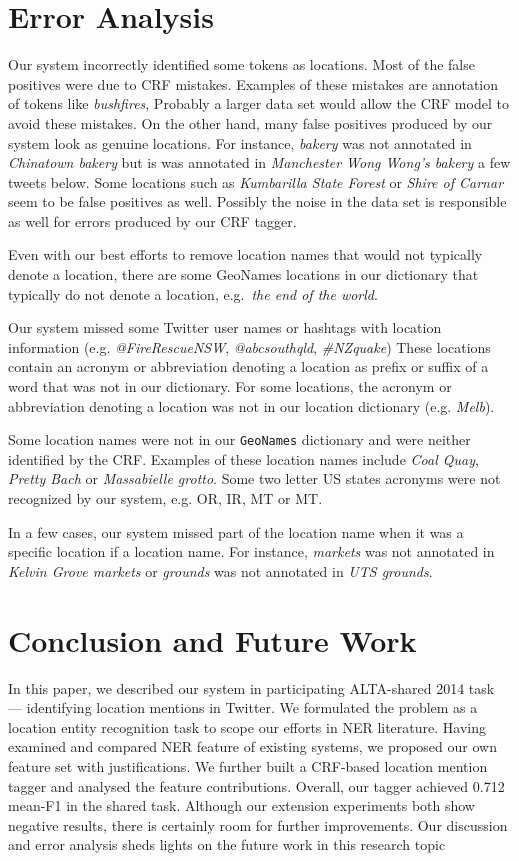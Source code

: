 \documentclass[11pt]{article}
\newcommand{\geoname}{\texttt{GeoNames}\xspace}
\newcommand{\myex}[1]{\textit{#1}}
\begin{document}
\section{Error Analysis}
\label{sec:error_analysis}

Our system incorrectly identified some tokens as locations.
Most of the false positives were due to CRF mistakes.
Examples of these mistakes are annotation of tokens like \myex{bushfires}, 
Probably a larger data set would allow the CRF model to avoid these mistakes.
On the other hand, many false positives produced by our system look as genuine locations.
For instance, \myex{bakery} was not annotated in \myex{Chinatown bakery} but is was annotated in \myex{Manchester Wong Wong's bakery} a few tweets below.
Some locations such as \myex{Kumbarilla State Forest} or \myex{Shire of Carnar} seem to be false positives as well.
Possibly the noise in the data set is responsible as well for errors produced by our CRF tagger.

Even with our best efforts to remove location names that would not typically denote a location, there are some GeoNames locations in our dictionary that typically do not denote a location, e.g.~\myex{the end of the world}.

Our system missed some Twitter user names or hashtags with location information (e.g. \myex{@FireRescueNSW}, \myex{@abcsouthqld}, \myex{\#NZquake})
These locations contain an acronym or abbreviation denoting a location as prefix or suffix of a word that was not in our dictionary.
For some locations, the acronym or abbreviation denoting a location was not in our location dictionary (e.g. \myex{Melb}).

Some location names were not in our \geoname dictionary and were neither identified by the CRF.
Examples of these location names include \myex{Coal Quay}, \myex{Pretty Bach} or \myex{Massabielle grotto}.
Some two letter US states acronyms were not recognized by our system, e.g. OR, IR, MT or MT.

In a few cases, our system missed part of the location name when it was a specific location if a location name.
For instance, \myex{markets} was not annotated in \myex{Kelvin Grove markets} or \myex{grounds} was not annotated in \myex{UTS grounds}.

\section{Conclusion and Future Work}
\label{sec:conclusion}
In this paper, we described our system in participating ALTA-shared 2014 task --- identifying location mentions in Twitter.
We formulated the problem as a location entity recognition task to scope our efforts in NER literature.
Having examined and compared NER feature of existing systems, we proposed our own feature set with justifications.
We further built a CRF-based location mention tagger and analysed the feature contributions.
Overall, our tagger achieved 0.712 mean-F1 in the shared task.
Although our extension experiments both show negative results, there is certainly room for further improvements.
Our discussion and error analysis sheds lights on the future work in this research topic



\end{document}
